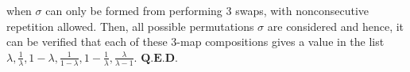 when $\sigma$ can only be formed from performing 3 swaps, with nonconsecutive repetition allowed. Then, all possible permutations $\sigma$ are considered and hence, it can be verified that each of these 3-map compositions gives a value in the list $\lambda, \frac{1}{\lambda}, 1 - \lambda, \frac{1}{1 - \lambda}, 1 - \frac{1}{\lambda}, \frac{\lambda}{\lambda - 1}$. $\mathbf{Q.E.D.}$ 


